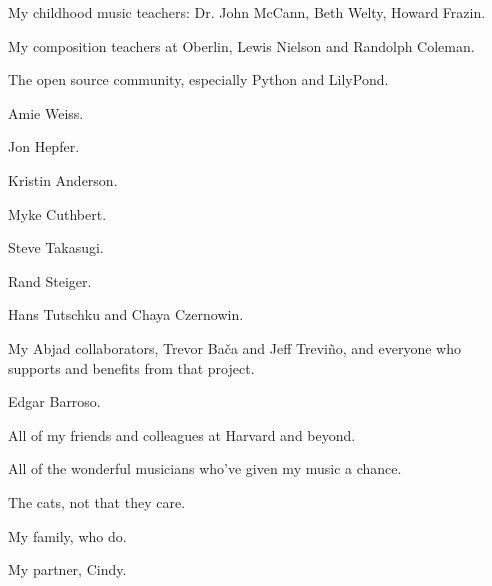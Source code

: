 

My childhood music teachers: Dr. John McCann, Beth Welty, Howard Frazin.

My composition teachers at Oberlin, Lewis Nielson and Randolph Coleman.

The open source community, especially Python and LilyPond.

Amie Weiss.

Jon Hepfer.

Kristin Anderson.

Myke Cuthbert.

Steve Takasugi.

Rand Steiger.

Hans Tutschku and Chaya Czernowin.

My Abjad collaborators, Trevor Ba\v{c}a and Jeff Trevi\~{n}o, and everyone who
supports and benefits from that project.

Edgar Barroso.

All of my friends and colleagues at Harvard and beyond.

All of the wonderful musicians who've given my music a chance.

The cats, not that they care.

My family, who do.

My partner, Cindy.